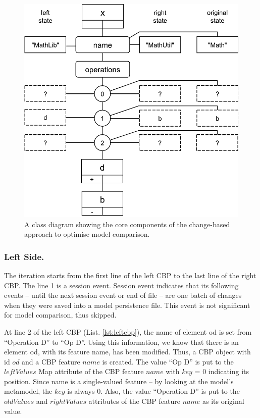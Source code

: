 \documentclass{llncs}
\begin{document}
\begin{figure}
    \vspace{-20pt}
    \includegraphics[width=\linewidth]{images/LeftElementTreeDiagram}
    \caption{A class diagram showing the core components of the change-based approach to optimise model comparison.}
    \label{fig:left_element_tree_diagram}
\end{figure}

\subsubsection{Left Side.}\label{sec:left_side} The iteration starts from the first line of the left CBP to the last line of the right CBP. The line 1 is a session event. Session event indicates that its following events -- until the next session event or end of file -- are one batch of changes when they were saved into a model persistence file. This event is not significant for model comparison, thus skipped.  



At line 2 of the left CBP (List. \ref{lst:leftcbp}), the \textsf{name} of element \textsf{od} is set from ``Operation D'' to ``Op D''. Using this information, we know that there is an element \textsf{od}, with its feature \textsf{name}, has been modified. Thus, a CBP object with id $od$ and a CBP feature $name$ is created. The value ``Op D'' is put to the $leftValues$ Map attribute of the CBP feature $name$ with $key$ = 0 indicating its position. Since \textsf{name} is a single-valued feature -- by looking at the model's metamodel, the $key$ is always 0. Also, the value ``Operation D'' is put to the $oldValues$ and $rightValues$ attributes of the CBP feature $name$ as its original value. 
\end{document}
